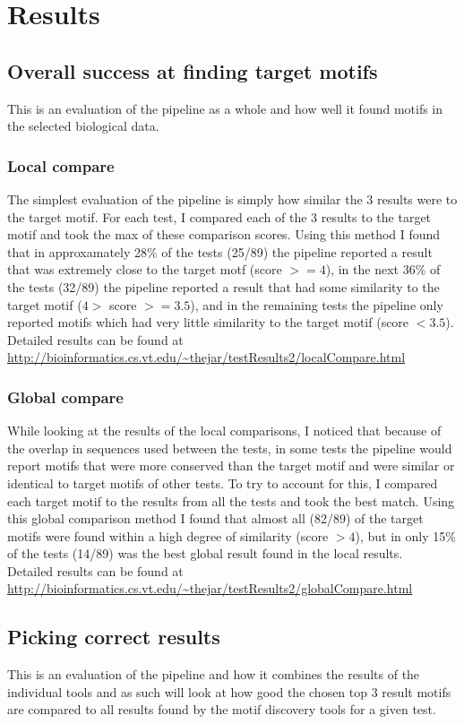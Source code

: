 \documentclass{article}
\begin{document}
\section{Results}
\subsection{Overall success at finding target motifs}
This is an evaluation of the pipeline as a whole and how well it found motifs
in the selected biological data.
\subsubsection{Local compare}
The simplest evaluation of the pipeline is simply how similar the 3 results
were to the target motif. For each test, I compared each of the 3 results to
the target motif and took the max of these comparison scores. Using this
method I found that in approxamately 28\% of the tests (25/89) the pipeline
reported a result that was extremely close to the target motf (score $>= 4$),
in the next 36\% of the tests (32/89) the pipeline reported a result that
had some similarity to the target motif ($4 >$ score $>= 3.5$), and in the
remaining tests the pipeline only reported motifs which had very little
similarity to the target motif (score $< 3.5$).\\
Detailed results can be found at
\url{http://bioinformatics.cs.vt.edu/~thejar/testResults2/localCompare.html}
\subsubsection{Global compare}
While looking at the results of the local comparisons, I noticed that because
of the overlap in sequences used between the tests, in some tests the pipeline
would report motifs that were more conserved than
the target motif and were similar or identical to target motifs of other tests.
To try to account for this, I compared each target motif to the results from
all the tests and took the best match. Using this global comparison method I
found that almost all (82/89) of the target motifs were found within a high
degree of similarity (score $> 4$), but in only 15\% of the tests (14/89) was
the best global result found in the local results.\\
Detailed results can be found at
\url{http://bioinformatics.cs.vt.edu/~thejar/testResults2/globalCompare.html}

\subsection{Picking correct results}
This is an evaluation of the pipeline and how it combines the results of the 
individual tools and as such will look at how good the chosen top 3 result
motifs are compared to all results found by the motif discovery tools for a
given test.\\
\end{document}
